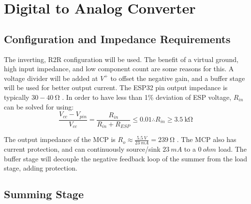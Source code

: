 \graphicspath{{content/2_design/figures/}}
\section{Digital to Analog Converter}
\subsection{Configuration and Impedance Requirements}

The inverting, R2R configuration will be used. The benefit of a virtual ground, high input impedance,
and low component count are some reasons for this. A voltage divider will be added at $V^+$ to offset the negative gain,
and a buffer stage will be used for better output current.
The ESP32 pin output impedance is typically $30 - \SI{40}{\ohm}$ \cite{datasheetESP}. In order to have less than 1\% deviation of ESP voltage, $R_{in}$ can be solved for using:
$$\frac{V_{cc} - V_{pin}}{V_{cc}} = \frac{R_{in}}{R_{in} + R_{ESP}} \leq 0.01 \therefore R_{in} \geq \SI{3.5}{\kilo\ohm} $$

\noindent The output impedance of the MCP is $R_o \approx \frac{\SI{5.5}{V}}{\SI{23}{mA}} = \SI{239}{\ohm}$ \cite{datasheetMCP6242}. The MCP also has current
protection, and can continuously source/sink $\SI{23}{mA}$ to a $\SI{0}{ohm}$ load. The buffer stage will decouple the negative feedback loop of the summer
from the load stage, adding protection.

\subsection{Summing Stage}


